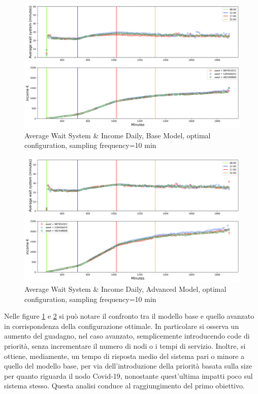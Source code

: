 \documentclass{article}
\begin{document}
\begin{figure}[H]
	\centering
	\captionsetup{justification=centering,margin=2cm}
	\includegraphics[scale=0.48]{images/ts_optimal_confronto.png}
	\caption{Average Wait System \& Income Daily, Base Model, optimal configuration, sampling frequency=10 min}\label{figura:ts_optimal_1}
\end{figure}
\begin{figure}[H]
	\centering
	\captionsetup{justification=centering,margin=2cm}
	\includegraphics[scale=0.48]{images/adv_ts_optimal.png}
	\caption{Average Wait System \& Income Daily, Advanced Model, optimal configuration, sampling frequency=10 min}\label{figura:adv_ts_optimal}
\end{figure}

Nelle figure \ref{figura:ts_optimal_1} e \ref{figura:adv_ts_optimal} si può notare il confronto tra il modello base e quello avanzato in corrispondenza della configurazione ottimale. In particolare si osserva un aumento del guadagno, nel caso avanzato, semplicemente introducendo code di priorità, senza incrementare il numero di nodi o i tempi di servizio. Inoltre, si ottiene, mediamente, un tempo di risposta medio del sistema pari o minore a quello del modello base, per via dell'introduzione della priorità basata sulla size per quanto riguarda il nodo Covid-19, nonostante quest'ultima impatti poco sul sistema stesso. Questa analisi conduce al raggiungimento del primo obiettivo.
\end{document}
